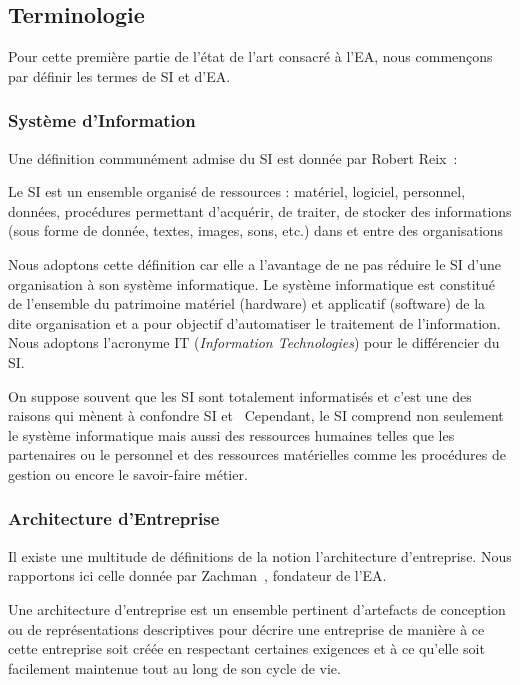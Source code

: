\subsection{Terminologie}

Pour cette première partie de l'état de l'art consacré à l'EA, nous commençons 
par définir les termes de SI et d'EA. 
	
\subsubsection{Système d'Information}
\label{sec:reix}

Une définition communément admise du SI est donnée par Robert Reix~\cite{reix1995systemes}:
\\
\begin{definition}
Le SI est un ensemble organisé de ressources : matériel, 
logiciel, personnel, données, procédures permettant d'acquérir, de traiter, de 
stocker des informations (sous forme de donnée, textes, images, sons, etc.) dans 
et entre des organisations
\end{definition}

Nous adoptons cette définition car elle a l'avantage de ne pas réduire le SI 
d'une organisation à son système informatique. Le système informatique est 
constitué de l'ensemble du patrimoine matériel (hardware) et applicatif 
(software) de la dite 
organisation et a pour objectif d'automatiser le traitement de l'information. 
Nous adoptons l'acronyme IT (\textit{Information Technologies}) pour le 
différencier du SI.

On suppose souvent que les SI sont totalement informatisés et c'est une des 
raisons qui mènent à confondre SI et \ Cependant, le SI comprend non seulement 
le système informatique mais aussi des ressources humaines telles que les 
partenaires ou le personnel et des ressources matérielles comme les procédures 
de gestion ou encore le savoir-faire métier.

\subsubsection{Architecture d'Entreprise}

Il existe une multitude de définitions de la notion  l'architecture d'entreprise. Nous
rapportons ici celle donnée par Zachman~\cite{zachman1997enterprise}, fondateur de l'EA. 
\\
\begin{definition}
Une architecture d'entreprise est un ensemble pertinent 
d'artefacts de conception ou de représentations descriptives pour décrire une 
entreprise de manière à ce cette entreprise soit créée en respectant certaines 
exigences et à ce qu'elle soit facilement maintenue tout au long de son cycle de 
vie. 
\end{definition}

